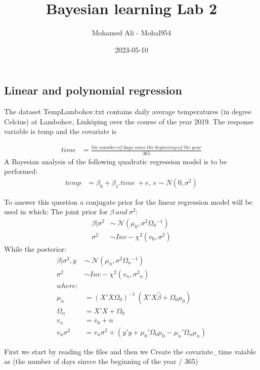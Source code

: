 \documentclass[
]{article}
\title{Bayesian learning Lab 2}
\author{Mohamed Ali - Mohal954}
\date{2023-05-10}
\begin{document}
\maketitle

\hypertarget{linear-and-polynomial-regression}{%
\subsection{Linear and polynomial
regression}\label{linear-and-polynomial-regression}}

The dataset TempLambohov.txt contains daily average temperatures (in
degree Celcius) at Lambohov, Linköping over the course of the year 2019.
The response variable is temp and the covariate is

\[
\begin{aligned}
time &= \frac{the \ number\ of\ days\ since\ the\ beginning\ of\ the\ year}{365}
\end{aligned}
\] A Bayesian analysis of the following quadratic regression model is to
be performed: \[
\begin{aligned}
temp &= \beta_0 + \beta_1.time \ + e,\ e\sim N(0,\sigma^2)
\end{aligned}
\]

To answer this question a conjugate prior for the linear regression
model will be used in which: The joint prior for
\(\beta \ and\  \sigma^2\): \[
\begin{aligned}
\beta|\sigma^2 &\sim \ \mathcal{N}(\mu_0,\sigma^2\Omega{_0}^{-1})\\ \sigma^2 &\sim Inv-\chi^2(v_0,\sigma^2)
\end{aligned}
\] While the posterior: \[
\begin{aligned}
\beta|\sigma^2,y &\sim \ \mathcal{N}(\mu_n,\sigma^2\Omega{_n}^{-1})\\ 
\sigma^2 &\sim Inv-\chi^2(v_n,\sigma{^2}{_n})\\
where:\\
\mu_n&= (X'X\Omega_0)^{-1}\ (X'X\hat\beta+\Omega_0\mu_0)\\
\Omega_n&=X'X+\Omega_0\\
v_n&= v_0+n\\
v_n\sigma^2&=v_n\sigma^2+(y'y+\mu_0'\Omega_0\mu_0-\mu_n'\Omega_n\mu_n)
\end{aligned}
\]

First we start by reading the files and then we Create the
covariate\_time vaiable as (the number of days sinvce the beginning of
the year / 365)
\end{document}
